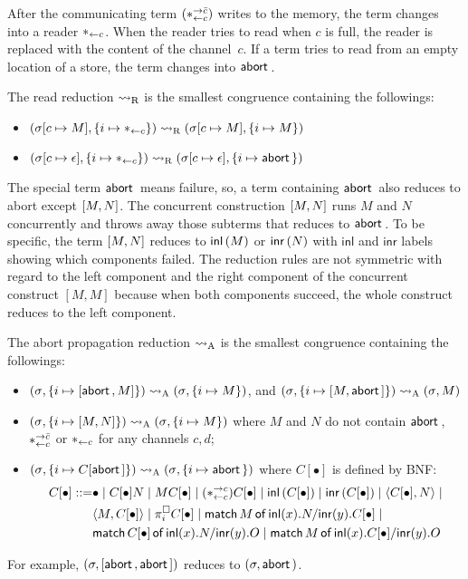{After the communicating term $(\ast^{\rightarrow {\bar{c}}}_{\leftarrow{c}})$ writes to the memory,
the term changes into a reader $\ast_{\leftarrow{c}}$.  When the reader tries to
read when $c$ is full, the reader is replaced with the content of the
channel~$c$.
If a term tries to read from an empty location of a store,
the term changes into $\mathsf{abort\,}$.
\begin{definition}
 \label{read}
 The read reduction $\rightsquigarrow_{\mathrm R}$ is the smallest congruence
 containing the
 followings:
\begin{itemize}
 \item $({\sigma}{[c\mapsto M]},{\{i\mapsto {\ast_{\leftarrow{c}}}\}})\rightsquigarrow_{\mathrm R} ({\sigma}{[c\mapsto M]},{\{i\mapsto {M}\}})$
 \item $({\sigma}{[c\mapsto \epsilon]},{\{i\mapsto {\ast_{\leftarrow{c}}}\}})
       \rightsquigarrow_{\mathrm R} ({\sigma}{[c\mapsto \epsilon]},{\{i\mapsto {\mathsf{abort\,}}\}})$
\end{itemize}
\end{definition}

The special term $\mathsf{abort\,}$ means failure, so, a term containing $\mathsf{abort\,}$
also reduces to abort except $[{M,N}]$.  The concurrent
construction $[{M,N}]$ runs $M$ and $N$ concurrently and throws
away those subterms that reduces to $\mathsf{abort\,}$.
To be specific, the term $[{M,N}]$ reduces to $\mathsf{inl}\left({M}\right)$
 or $\mathsf{inr}\left({N}\right)$ with $\mathsf{inl}$ and
$\mathsf{inr}$ labels showing which components failed.
The reduction rules are not symmetric with regard to the left component
and the right component of the concurrent construct $[M, M]$ because
when both components succeed, the whole construct reduces to
the left component.
\begin{definition}
 The abort propagation reduction $\rightsquigarrow_{\mathrm A}$ is the smallest
 congruence containing the
 followings:
\begin{itemize}
 \item  $({\sigma}{},{\{i\mapsto {[{\mathsf{abort\,}, M}]}\}})\rightsquigarrow_{\mathrm A}
 ({\sigma}{},{\{i\mapsto {M}\}})$, and
   $({\sigma}{},{\{i\mapsto {[{M,\mathsf{abort\,}}]}\}})\rightsquigarrow_{\mathrm A}
 ({\sigma}{},{{M}})$
 \item $({\sigma}{},{\{i\mapsto {[{M,N}]}\}})\rightsquigarrow_{\mathrm A} ({\sigma}{},{\{i\mapsto {M}\}})$ where
       $M$ and $N$ do not contain $\mathsf{abort\,}$, $\ast^{\rightarrow {\bar{c}}}_{\leftarrow{c}}$ or $\ast_{\leftarrow{c}}$
       for any channels $c,d$;
 \item  $({\sigma}{},{\{i\mapsto {C[\mathsf{abort\,}]}\}})\rightsquigarrow_{\mathrm A}
 ({\sigma}{},{\{i\mapsto {\mathsf{abort\,}}\}})$  where $C[\bullet]$ is defined by BNF:
\begin{align*}
  C[\bullet] ::= &\bullet \mid
C[\bullet] N \mid
{M C[\bullet]}\mid
(\ast^{\rightarrow {c}}_{\leftarrow{c}})C[\bullet]\mid
\mathsf{inl}\left({C[\bullet]}\right)\mid
\mathsf{inr}\left({C[\bullet]}\right)\mid
\langle{C[\bullet], N}\rangle\mid \\&
\langle{M, C[\bullet]}\rangle\mid
\pi^\square_i{C[\bullet]}\mid
\mathsf{match}\,{M}\,\mathsf{of}\, \mathsf{inl}({x}). {N}/ \mathsf{inr}({y}). {C[\bullet]}\mid\\ &
\mathsf{match}\,{C[\bullet]}\,\mathsf{of}\, \mathsf{inl}({x}). {N}/ \mathsf{inr}({y}). {O}\mid
\mathsf{match}\,{M}\,\mathsf{of}\, \mathsf{inl}({x}). {C[\bullet]}/ \mathsf{inr}({y}). {O}
\end{align*}
\end{itemize}
\end{definition}
For example, $(\sigma, [{\mathsf{abort\,},\mathsf{abort\,}}])$ reduces to $(\sigma,
\mathsf{abort\,})$.

}
